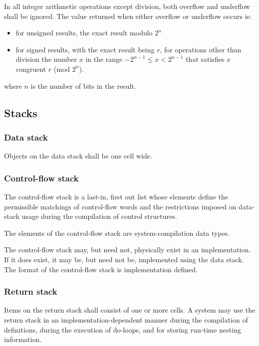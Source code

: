 In all integer arithmetic operations except division, both overflow
and underflow shall be ignored.  The value returned when either
overflow or underflow occurs is:

\begin{itemize}
\item for unsigned results, the exact result modulo $2^n$
\item for signed results, with the exact result being $r$,
	for operations other than division the number $x$ in the range $-2^{n-1}\leq x<2^{n-1}$ that
	satisfies $x$ congruent $r$ (mod $2^n$).
\end{itemize}
where $n$ is the number of bits in the result.

\subsection{Stacks} %

\subsubsection{Data stack} %
\label{usage:datastack}

Objects on the data stack shall be one cell wide.

\subsubsection{Control-flow stack} %
\label{usage:controlstack}

The control-flow stack is a last-in, first out list whose elements
define the permissible matchings of control-flow words and the
restrictions imposed on data-stack usage during the compilation of
control structures.

The elements of the control-flow stack are system-compilation data
types.

The control-flow stack may, but need not, physically exist in an
implementation. If it does exist, it may be, but need not be,
implemented using the data stack. The format of the control-flow
stack is implementation defined.

\subsubsection{Return stack} %
\label{usage:returnstack}

Items on the return stack shall consist of one or more cells. A
system may use the return stack in an implementation-dependent
manner during the compilation of definitions, during the execution
of do-loops, and for storing run-time nesting information.

